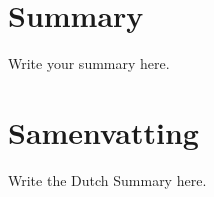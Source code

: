 \chapter*{Summary}

Write your summary here.

\chapter*{Samenvatting}

{
	
	Write the Dutch Summary here.
}

